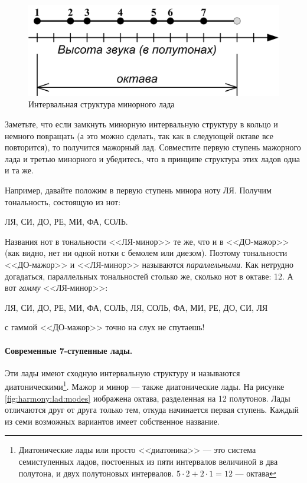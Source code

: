 \begin{figure}[!ht]
    \centering
    \includegraphics{fig/intervals/mode-min} 
    \caption{Интервальная структура минорного лада}\label{fig:harmony:lad:mode:min}
\end{figure} 

Заметьте, что если замкнуть минорную интервальную структуру в кольцо и немного повращать (а это можно сделать, так как в следующей октаве все повторится), то получится мажорный лад. Совместите первую ступень мажорного лада и третью минорного и убедитесь, что в принципе структура этих ладов одна и та же. 

Например, давайте положим в первую ступень минора ноту ЛЯ. Получим тональность, состоящую из нот:
\begin{center}
    ЛЯ, СИ, ДО, РЕ, МИ, ФА, СОЛЬ.
\end{center}

Названия нот в тональности <<ЛЯ-минор>> те же, что и в <<ДО-мажор>> (как видно, нет ни одной нотки с бемолем или диезом). Поэтому тональности <<ДО-мажор>> и <<ЛЯ-минор>> называются \emph{параллельными}. Как нетрудно догадаться, параллельных тональностей столько же, сколько нот в октаве: 12. А вот \emph{гамму} <<ЛЯ-минор>>:
\begin{center}
    ЛЯ, СИ, ДО, РЕ, МИ, ФА, СОЛЬ, ЛЯ, СОЛЬ, ФА, МИ, РЕ, ДО, СИ, ЛЯ
\end{center}
с гаммой <<ДО-мажор>> точно на слух не спутаешь!

\paragraph{Современные 7-ступенные лады.} Эти лады имеют сходную интервальную структуру и называются диатоническими\footnote{Диатонические лады или просто <<диатоника>> --- это система семиступенных ладов, постоенных из пяти интервалов величиной в два полутона, и двух полутоновых интервалов. $5\cdot2 + 2\cdot 1 = 12$ --- октава}. Мажор и минор --- также диатонические лады. На рисунке \ref{fig:harmony:lad:modes} иображена октава, разделенная на 12 полутонов. Лады отличаются друг от друга только тем, откуда начинается первая ступень. Каждый из семи возможных вариантов имеет собственное название. 

